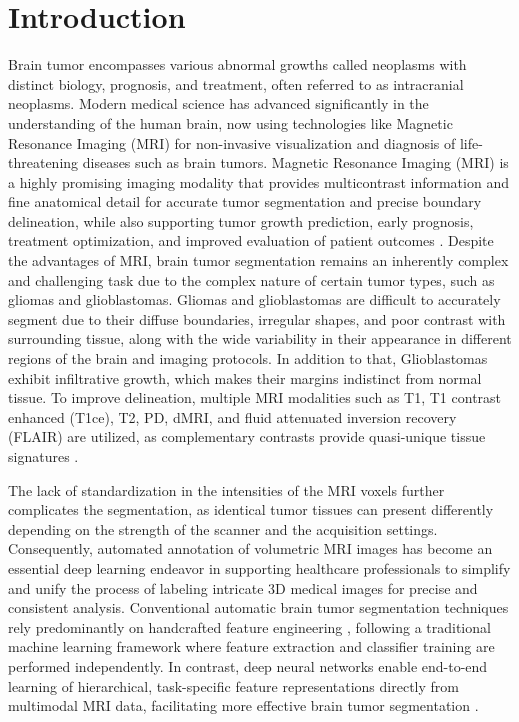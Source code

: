 
\section{Introduction}

Brain tumor \cite{deangelis2001brain} encompasses various abnormal growths called neoplasms with distinct biology, prognosis, and treatment, often referred to as intracranial neoplasms. Modern medical science has advanced significantly in the understanding of the human brain, now using technologies like Magnetic Resonance Imaging (MRI) \cite{hashemi2012mri,brown2011mri} for non-invasive visualization and diagnosis of life-threatening diseases such as brain tumors. Magnetic Resonance Imaging (MRI) is a highly promising imaging modality that provides multicontrast information and fine anatomical detail for accurate tumor segmentation and precise boundary delineation, while also supporting tumor growth prediction, early prognosis, treatment optimization, and improved evaluation of patient outcomes \cite{amin2020distinctive}. Despite the advantages of MRI, brain tumor segmentation remains an inherently complex and challenging task due to the complex nature of certain tumor types, such as gliomas and glioblastomas. Gliomas and glioblastomas \cite{bahadure2017image} are difficult to accurately segment due to their diffuse boundaries, irregular shapes, and poor contrast with surrounding tissue, along with the wide variability in their appearance in different regions of the brain and imaging protocols. In addition to that, Glioblastomas exhibit infiltrative growth, which makes their margins indistinct from normal tissue. To improve delineation, multiple MRI modalities such as T1, T1 contrast enhanced (T1ce), T2, PD, dMRI, and fluid attenuated inversion recovery (FLAIR) are utilized, as complementary contrasts provide quasi-unique tissue signatures \cite{li2019multi, islam2021glioblastoma, rathore2018radiomic, hasan2016segmentation}.

The lack of standardization in the intensities of the MRI voxels further complicates the segmentation, as identical tumor tissues can present differently depending on the strength of the scanner and the acquisition settings. Consequently, automated annotation of volumetric MRI images has become an essential deep learning endeavor in supporting healthcare professionals to simplify and unify the process of labeling intricate 3D medical images for precise and consistent analysis. Conventional automatic brain tumor segmentation techniques rely predominantly on handcrafted feature engineering \cite{menze2014multimodal}, following a traditional machine learning framework where feature extraction and classifier training are performed independently. In contrast, deep neural networks enable end-to-end learning of hierarchical, task-specific feature representations directly from multimodal MRI data, facilitating more effective brain tumor segmentation \cite{bengio2013representation}.

